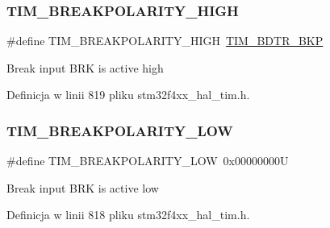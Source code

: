 \subsubsection{\texorpdfstring{T\+I\+M\+\_\+\+B\+R\+E\+A\+K\+P\+O\+L\+A\+R\+I\+T\+Y\+\_\+\+H\+I\+GH}{TIM\_BREAKPOLARITY\_HIGH}}
{\footnotesize\ttfamily \#define T\+I\+M\+\_\+\+B\+R\+E\+A\+K\+P\+O\+L\+A\+R\+I\+T\+Y\+\_\+\+H\+I\+GH~\hyperlink{group___peripheral___registers___bits___definition_ga3247abbbf0d00260be051d176d88020e}{T\+I\+M\+\_\+\+B\+D\+T\+R\+\_\+\+B\+KP}}

Break input B\+RK is active high 

Definicja w linii 819 pliku stm32f4xx\+\_\+hal\+\_\+tim.\+h.

\mbox{\label{group___t_i_m___break___polarity_ga3e07cb0376c1bf561341dc8befb66208}} 
\subsubsection{\texorpdfstring{T\+I\+M\+\_\+\+B\+R\+E\+A\+K\+P\+O\+L\+A\+R\+I\+T\+Y\+\_\+\+L\+OW}{TIM\_BREAKPOLARITY\_LOW}}
{\footnotesize\ttfamily \#define T\+I\+M\+\_\+\+B\+R\+E\+A\+K\+P\+O\+L\+A\+R\+I\+T\+Y\+\_\+\+L\+OW~0x00000000U}

Break input B\+RK is active low 

Definicja w linii 818 pliku stm32f4xx\+\_\+hal\+\_\+tim.\+h.

